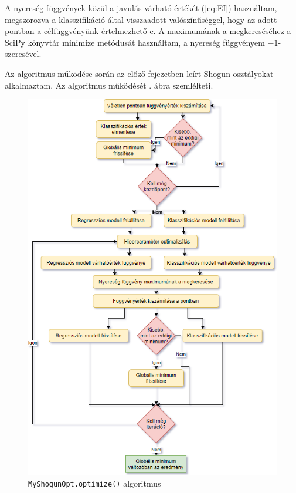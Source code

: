 A nyereség függvények közül a javulás várható értékét (\ref{eq:EI}) használtam, megszorozva a klasszifikáció által visszaadott valószínűséggel, hogy az adott pontban a célfüggvényünk értelmezhető-e. A maximumának a megkereséséhez a SciPy könyvtár minimize metódusát használtam, a nyereség függvényem $-1$-szeresével.

Az algoritmus működése során az előző fejezetben leírt Shogun osztályokat alkalmaztam. Az algoritmus működését . ábra szemlélteti.

\begin{figure}
	\centering
	\includegraphics[width=140mm, keepaspectratio]{figures/shogun.png}
	\caption{\texttt{MyShogunOpt.optimize()} algoritmus}
	\label{fig:shogun}
\end{figure}











